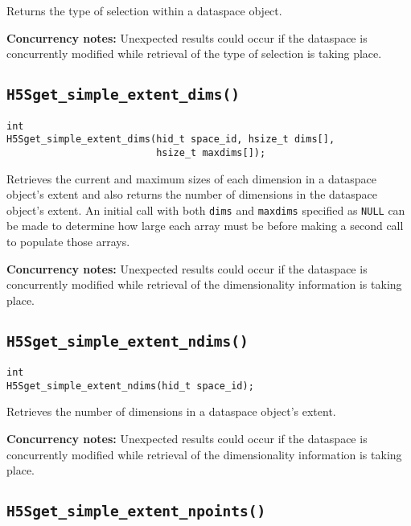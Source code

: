\documentclass[../HDF5_RFC.tex]{subfiles}
\begin{document}
Returns the type of selection within a dataspace object.

\textbf{Concurrency notes:} Unexpected results could occur if the dataspace is concurrently
modified while retrieval of the type of selection is taking place.

\subsection{\texttt{H5Sget\_simple\_extent\_dims()}}
\label{apdx:h5s_func_h5sget_simple_extent_dims}

\begin{verbatim}
int
H5Sget_simple_extent_dims(hid_t space_id, hsize_t dims[],
                          hsize_t maxdims[]);
\end{verbatim}

Retrieves the current and maximum sizes of each dimension in a dataspace object's extent and also
returns the number of dimensions in the dataspace object's extent. An initial call with both
\texttt{dims} and \texttt{maxdims} specified as \texttt{NULL} can be made to determine how large
each array must be before making a second call to populate those arrays.

\textbf{Concurrency notes:} Unexpected results could occur if the dataspace is concurrently modified
while retrieval of the dimensionality information is taking place.

\subsection{\texttt{H5Sget\_simple\_extent\_ndims()}}
\label{apdx:h5s_func_h5sget_simple_extent_ndims}

\begin{verbatim}
int
H5Sget_simple_extent_ndims(hid_t space_id);
\end{verbatim}

Retrieves the number of dimensions in a dataspace object's extent.

\textbf{Concurrency notes:} Unexpected results could occur if the dataspace is concurrently modified
while retrieval of the dimensionality information is taking place.

\subsection{\texttt{H5Sget\_simple\_extent\_npoints()}}
\label{apdx:h5s_func_h5sget_simple_extent_npoints}
\end{document}
